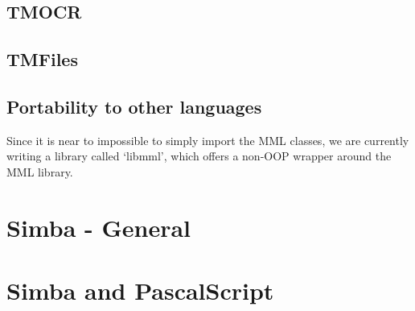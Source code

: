 \documentclass[a4paper, 10pt]{report} %
\begin{document}
\section{TMOCR}

\section{TMFiles}

\section{Portability to other languages}

Since it is near to impossible to simply import the MML classes, we are
currently writing a library called `libmml', which offers a non-OOP wrapper
around the MML library.

\chapter{Simba - General}

\chapter{Simba and PascalScript}
\end{document}
